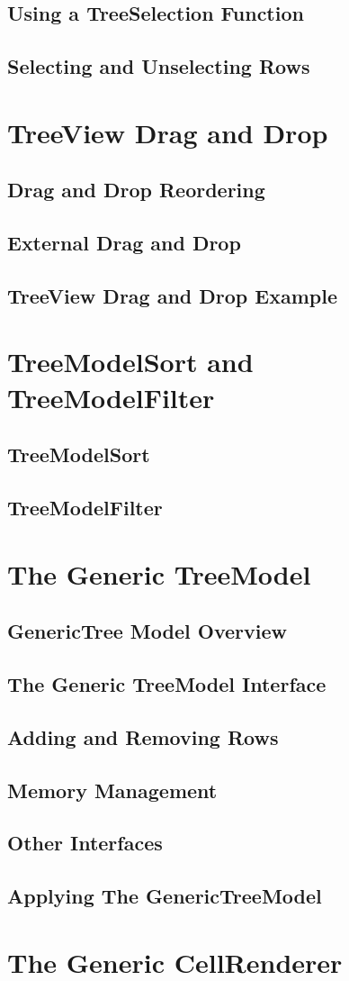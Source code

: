 	\subsection{Using a TreeSelection Function}
	\subsection{Selecting and Unselecting Rows}
\section{TreeView Drag and Drop}
	\subsection{Drag and Drop Reordering}
	\subsection{External Drag and Drop}
	\subsection{TreeView Drag and Drop Example}
\section{TreeModelSort and TreeModelFilter}
	\subsection{TreeModelSort}
	\subsection{TreeModelFilter}
\section{The Generic TreeModel}
	\subsection{GenericTree Model Overview}
	\subsection{The Generic TreeModel Interface}
	\subsection{Adding and Removing Rows}
	\subsection{Memory Management}
	\subsection{Other Interfaces}
	\subsection{Applying The GenericTreeModel}
\section{The Generic CellRenderer}
